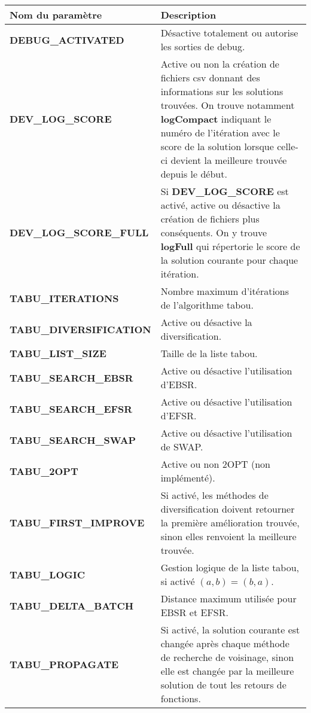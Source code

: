\documentclass[hideweeklyreports]{polytech/polytech}
\begin{document}
				\begin{centering}
					\begin{tabularx}{\textwidth}{|l|X|}
						\hline
						Nom du paramètre & Description\\\hline\hline
						\textbf{DEBUG\_ACTIVATED} & Désactive totalement ou autorise les sorties de debug.\\\hline
						\textbf{DEV\_LOG\_SCORE} & Active ou non la création de fichiers csv donnant des informations sur les solutions trouvées. On trouve notamment \textbf{logCompact} indiquant le numéro de l'itération avec le score de la solution lorsque celle-ci devient la meilleure trouvée depuis le début.\\\hline
						\textbf{DEV\_LOG\_SCORE\_FULL}&  Si \textbf{DEV\_LOG\_SCORE} est activé, active ou désactive la création de fichiers plus conséquents. On y trouve \textbf{logFull} qui répertorie le score de la solution courante pour chaque itération.\\\hline
						\textbf{TABU\_ITERATIONS} & Nombre maximum d'itérations de l'algorithme tabou.\\\hline
						\textbf{TABU\_DIVERSIFICATION} & Active ou désactive la diversification.\\\hline
						\textbf{TABU\_LIST\_SIZE} & Taille de la liste tabou.\\\hline
						\textbf{TABU\_SEARCH\_EBSR} & Active ou désactive l'utilisation d'EBSR.\\\hline
						\textbf{TABU\_SEARCH\_EFSR} & Active ou désactive l'utilisation d'EFSR.\\\hline
						\textbf{TABU\_SEARCH\_SWAP} & Active ou désactive l'utilisation de SWAP.\\\hline
						\textbf{TABU\_2OPT} & Active ou non 2OPT (non implémenté).\\\hline
						\textbf{TABU\_FIRST\_IMPROVE} & Si activé, les méthodes de diversification doivent retourner la première amélioration trouvée, sinon elles renvoient la meilleure trouvée.\\\hline
						\textbf{TABU\_LOGIC} & Gestion logique de la liste tabou, si activé $\left( a,b\right)=\left( b,a\right)$.\\\hline
						\textbf{TABU\_DELTA\_BATCH} & Distance maximum utilisée pour EBSR et EFSR.\\\hline
						\textbf{TABU\_PROPAGATE} & Si activé, la solution courante est changée après chaque méthode de recherche de voisinage, sinon elle est changée par la meilleure solution de tout les retours de fonctions.\\\hline

\end{tabularx}
\end{centering}
\end{document}
